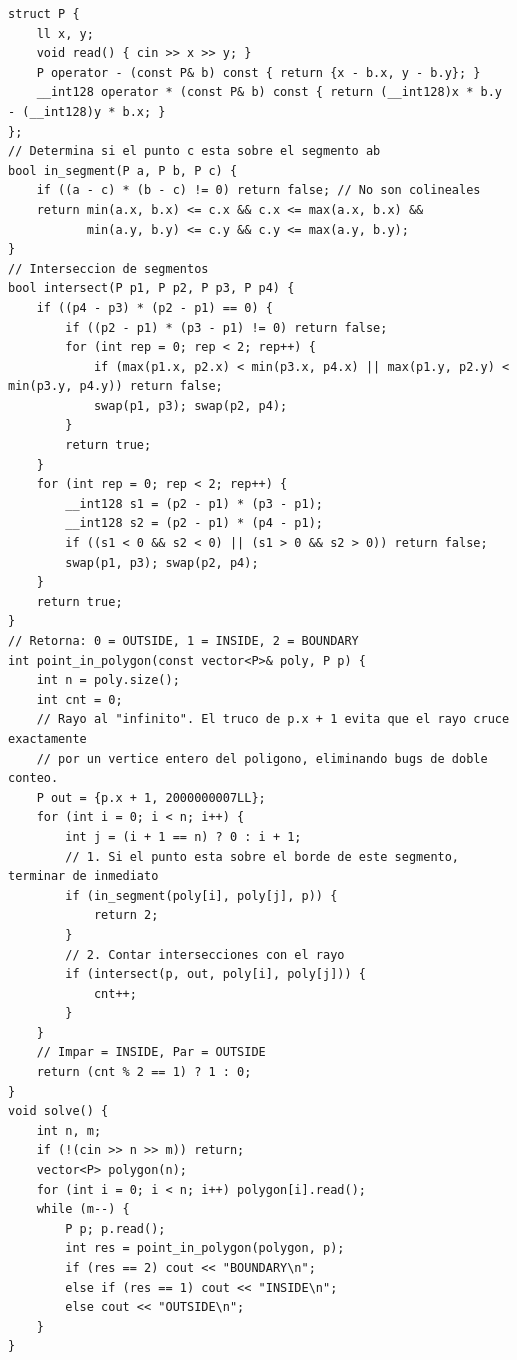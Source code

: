 \documentclass[10pt,landscape,twocolumn]{article}
\begin{document}
\begin{lstlisting}
struct P {
    ll x, y;
    void read() { cin >> x >> y; }
    P operator - (const P& b) const { return {x - b.x, y - b.y}; }
    __int128 operator * (const P& b) const { return (__int128)x * b.y - (__int128)y * b.x; }
};
// Determina si el punto c esta sobre el segmento ab
bool in_segment(P a, P b, P c) {
    if ((a - c) * (b - c) != 0) return false; // No son colineales
    return min(a.x, b.x) <= c.x && c.x <= max(a.x, b.x) &&
           min(a.y, b.y) <= c.y && c.y <= max(a.y, b.y);
}
// Interseccion de segmentos
bool intersect(P p1, P p2, P p3, P p4) {
    if ((p4 - p3) * (p2 - p1) == 0) {
        if ((p2 - p1) * (p3 - p1) != 0) return false;
        for (int rep = 0; rep < 2; rep++) {
            if (max(p1.x, p2.x) < min(p3.x, p4.x) || max(p1.y, p2.y) < min(p3.y, p4.y)) return false;
            swap(p1, p3); swap(p2, p4);
        }
        return true;
    }
    for (int rep = 0; rep < 2; rep++) {
        __int128 s1 = (p2 - p1) * (p3 - p1);
        __int128 s2 = (p2 - p1) * (p4 - p1);
        if ((s1 < 0 && s2 < 0) || (s1 > 0 && s2 > 0)) return false;
        swap(p1, p3); swap(p2, p4);
    }
    return true;
}
// Retorna: 0 = OUTSIDE, 1 = INSIDE, 2 = BOUNDARY
int point_in_polygon(const vector<P>& poly, P p) {
    int n = poly.size();
    int cnt = 0;
    // Rayo al "infinito". El truco de p.x + 1 evita que el rayo cruce exactamente
    // por un vertice entero del poligono, eliminando bugs de doble conteo.
    P out = {p.x + 1, 2000000007LL}; 
    for (int i = 0; i < n; i++) {
        int j = (i + 1 == n) ? 0 : i + 1;
        // 1. Si el punto esta sobre el borde de este segmento, terminar de inmediato
        if (in_segment(poly[i], poly[j], p)) {
            return 2; 
        }
        // 2. Contar intersecciones con el rayo
        if (intersect(p, out, poly[i], poly[j])) {
            cnt++;
        }
    }
    // Impar = INSIDE, Par = OUTSIDE
    return (cnt % 2 == 1) ? 1 : 0;
}
void solve() {
    int n, m; 
    if (!(cin >> n >> m)) return;
    vector<P> polygon(n);
    for (int i = 0; i < n; i++) polygon[i].read();
    while (m--) {
        P p; p.read();
        int res = point_in_polygon(polygon, p);
        if (res == 2) cout << "BOUNDARY\n";
        else if (res == 1) cout << "INSIDE\n";
        else cout << "OUTSIDE\n";
    }
}
\end{lstlisting}
\end{document}
